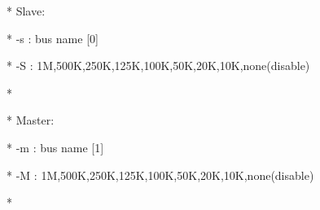 \documentclass[a4paper,12pt]{book}
\begin{document}
{\ttfamily
* \space \space \space Slave:
\space \space \space \space \space \space \space \space \space \space \space \space \space \space \space \space \space \space \space \space \space \space \space \space \space \space \space \space \space \space \space \space \space \space \space \space \space \space \space \space \space \space \space \space \space \space \space \space \space *}

{\ttfamily
* \space \space \space \space {}-s : bus name [{\textquotedbl}0{\textquotedbl}]
\space \space \space \space \space \space \space \space \space \space \space \space \space \space \space \space \space \space \space \space \space \space \space \space \space \space \space \space \space \space \space \space \space \space \space *}

{\ttfamily
* \space \space \space \space {}-S : 1M,500K,250K,125K,100K,50K,20K,10K,none(disable) \space *}

{\ttfamily
*
\space \space \space \space \space \space \space \space \space \space \space \space \space \space \space \space \space \space \space \space \space \space \space \space \space \space \space \space \space \space \space \space \space \space \space \space \space \space \space \space \space \space \space \space \space \space \space \space \space \space \space \space \space \space \space \space \space \space \space *}

{\ttfamily
* \space \space \space Master:
\space \space \space \space \space \space \space \space \space \space \space \space \space \space \space \space \space \space \space \space \space \space \space \space \space \space \space \space \space \space \space \space \space \space \space \space \space \space \space \space \space \space \space \space \space \space \space \space *}

{\ttfamily
* \space \space \space \space {}-m : bus name [{\textquotedbl}1{\textquotedbl}]
\space \space \space \space \space \space \space \space \space \space \space \space \space \space \space \space \space \space \space \space \space \space \space \space \space \space \space \space \space \space \space \space \space \space \space *}

{\ttfamily
* \space \space \space \space {}-M : 1M,500K,250K,125K,100K,50K,20K,10K,none(disable) \space *}

{\ttfamily
*
\space \space \space \space \space \space \space \space \space \space \space \space \space \space \space \space \space \space \space \space \space \space \space \space \space \space \space \space \space \space \space \space \space \space \space \space \space \space \space \space \space \space \space \space \space \space \space \space \space \space \space \space \space \space \space \space \space \space \space *}
\end{document}
